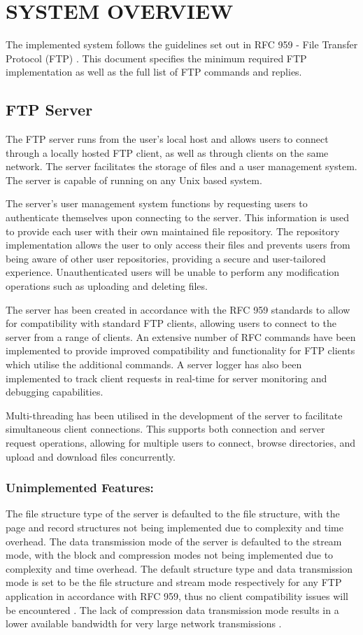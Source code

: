 \documentclass[10pt,twocolumn]{witseiepaper}
\begin{document}
\section{SYSTEM OVERVIEW}
The implemented system follows the guidelines set out in RFC 959 - File Transfer Protocol (FTP) \cite{rfc}. This document specifies the minimum required FTP implementation as well as the full list of FTP commands and replies.

\subsection{FTP Server}
The FTP server runs from the user's local host and allows users to connect through a locally hosted FTP client, as well as through clients on the same network. The server facilitates the storage of files and a user management system. The server is capable of running on any Unix based system.

The server's user management system functions by requesting users to authenticate themselves upon connecting to the server. This information is used to provide each user with their own maintained file repository. The repository implementation allows the user to only access their files and prevents users from being aware of other user repositories, providing a secure and user-tailored experience. Unauthenticated users will be unable to perform any modification operations such as uploading and deleting files.

The server has been created in accordance with the RFC 959 standards to allow for compatibility with standard FTP clients, allowing users to connect to the server from a range of clients. An extensive number of RFC commands have been implemented to provide improved compatibility and functionality for FTP clients which utilise the additional commands. A server logger has also been implemented to track client requests in real-time for server monitoring and debugging capabilities.

Multi-threading has been utilised in the development of the server to facilitate simultaneous client connections. This supports both connection and server request operations, allowing for multiple users to connect, browse directories, and upload and download files concurrently.

\subsubsection*{Unimplemented Features:}
The file structure type of the server is defaulted to the file structure, with the page and record structures not being implemented due to complexity and time overhead. The data transmission mode of the server is defaulted to the stream mode, with the block and compression modes not being implemented due to complexity and time overhead. The default structure type and data transmission mode is set to be the file structure and stream mode respectively for any FTP application in accordance with RFC 959, thus no client compatibility issues will be encountered \cite{rfc}. The lack of compression data transmission mode results in a lower available bandwidth for very large network transmissions \cite{rfc}.
\end{document}
